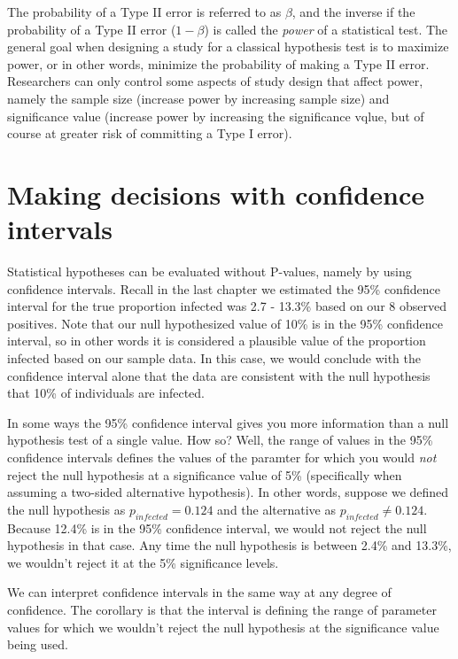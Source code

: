 \documentclass[
]{book}
\begin{document}
The probability of a Type II error is referred to as \(\beta\), and the inverse if the probability of a Type II error (\(1-\beta\)) is called the \emph{power} of a statistical test. The general goal when designing a study for a classical hypothesis test is to maximize power, or in other words, minimize the probability of making a Type II error. Researchers can only control some aspects of study design that affect power, namely the sample size (increase power by increasing sample size) and significance value (increase power by increasing the significance vqlue, but of course at greater risk of committing a Type I error).

\section{Making decisions with confidence intervals}\label{making-decisions-with-confidence-intervals}

Statistical hypotheses can be evaluated without P-values, namely by using confidence intervals. Recall in the last chapter we estimated the 95\% confidence interval for the true proportion infected was 2.7 - 13.3\% based on our 8 observed positives. Note that our null hypothesized value of 10\% is in the 95\% confidence interval, so in other words it is considered a plausible value of the proportion infected based on our sample data. In this case, we would conclude with the confidence interval alone that the data are consistent with the null hypothesis that 10\% of individuals are infected.

In some ways the 95\% confidence interval gives you more information than a null hypothesis test of a single value. How so? Well, the range of values in the 95\% confidence intervals defines the values of the paramter for which you would \emph{not} reject the null hypothesis at a significance value of 5\% (specifically when assuming a two-sided alternative hypothesis). In other words, suppose we defined the null hypothesis as \(p_{infected} = 0.124%
\) and the alternative as \(p_{infected} \neq 0.124\). Because 12.4\% is in the 95\% confidence interval, we would not reject the null hypothesis in that case. Any time the null hypothesis is between 2.4\% and 13.3\%, we wouldn't reject it at the 5\% significance levels.

We can interpret confidence intervals in the same way at any degree of confidence. The corollary is that the interval is defining the range of parameter values for which we wouldn't reject the null hypothesis at the significance value being used.
\end{document}
